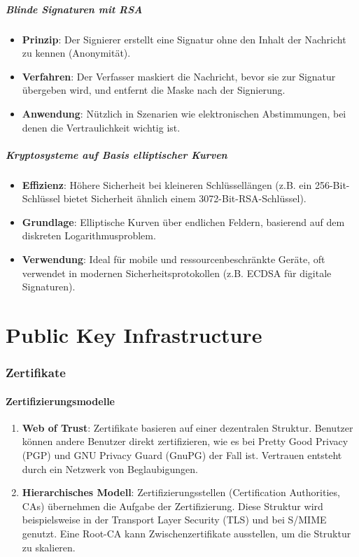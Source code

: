 \documentclass{article}
\begin{document}
\subsubsection{Blinde Signaturen mit RSA}
\begin{itemize}
  \item \textbf{Prinzip}: Der Signierer erstellt eine Signatur ohne den Inhalt der Nachricht zu kennen (Anonymität).
  \item \textbf{Verfahren}: Der Verfasser maskiert die Nachricht, bevor sie zur Signatur übergeben wird, und entfernt die Maske nach der Signierung.
  \item \textbf{Anwendung}: Nützlich in Szenarien wie elektronischen Abstimmungen, bei denen die Vertraulichkeit wichtig ist.
\end{itemize}

\subsubsection{Kryptosysteme auf Basis elliptischer Kurven}
\begin{itemize}
  \item \textbf{Effizienz}: Höhere Sicherheit bei kleineren Schlüssellängen (z.B. ein 256-Bit-Schlüssel bietet Sicherheit ähnlich einem 3072-Bit-RSA-Schlüssel).
  \item \textbf{Grundlage}: Elliptische Kurven über endlichen Feldern, basierend auf dem diskreten Logarithmusproblem.
  \item \textbf{Verwendung}: Ideal für mobile und ressourcenbeschränkte Geräte, oft verwendet in modernen Sicherheitsprotokollen (z.B. ECDSA für digitale Signaturen).
\end{itemize}




\part{Public Key Infrastructure}

\section{Zertifikate}

\subsection{Zertifizierungsmodelle}
\begin{enumerate}
  \item \textbf{Web of Trust}: Zertifikate basieren auf einer dezentralen Struktur. Benutzer können andere Benutzer direkt zertifizieren, wie es bei Pretty Good Privacy (PGP) und GNU Privacy Guard (GnuPG) der Fall ist. Vertrauen entsteht durch ein Netzwerk von Beglaubigungen.
  \item \textbf{Hierarchisches Modell}: Zertifizierungsstellen (Certification Authorities, CAs) übernehmen die Aufgabe der Zertifizierung. Diese Struktur wird beispielsweise in der Transport Layer Security (TLS) und bei S/MIME genutzt. Eine Root-CA kann Zwischenzertifikate ausstellen, um die Struktur zu skalieren.
\end{enumerate}
\end{document}
